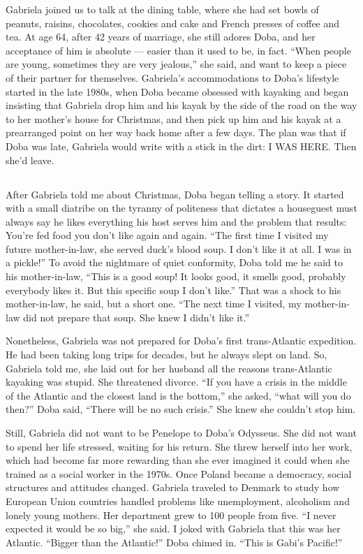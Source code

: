 Gabriela joined us to talk at the dining table, where she had set bowls
of peanuts, raisins, chocolates, cookies and cake and French presses of
coffee and tea. At age 64, after 42 years of marriage, she still adores
Doba, and her acceptance of him is absolute --- easier than it used to
be, in fact. ``When people are young, sometimes they are very jealous,''
she said, and want to keep a piece of their partner for themselves.
Gabriela's accommodations to Doba's lifestyle started in the late 1980s,
when Doba became obsessed with kayaking and began insisting that
Gabriela drop him and his kayak by the side of the road on the way to
her mother's house for Christmas, and then pick up him and his kayak at
a prearranged point on her way back home after a few days. The plan was
that if Doba was late, Gabriela would write with a stick in the dirt: I
WAS HERE. Then she'd leave.

\hypertarget{-2}{%
\subsection{}\label{-2}}

After Gabriela told me about Christmas, Doba began telling a story. It
started with a small diatribe on the tyranny of politeness that dictates
a houseguest must always say he likes everything his host serves him and
the problem that results: You're fed food you don't like again and
again. ``The first time I visited my future mother-in-law, she served
duck's blood soup. I don't like it at all. I was in a pickle!'' To avoid
the nightmare of quiet conformity, Doba told me he said to his
mother-in-law, ``This is a good soup! It looks good, it smells good,
probably everybody likes it. But this specific soup I don't like.'' That
was a shock to his mother-in-law, he said, but a short one. ``The next
time I visited, my mother-in-law did not prepare that soup. She knew I
didn't like it.''

Nonetheless, Gabriela was not prepared for Doba's first trans-Atlantic
expedition. He had been taking long trips for decades, but he always
slept on land. So, Gabriela told me, she laid out for her husband all
the reasons trans-Atlantic kayaking was stupid. She threatened divorce.
``If you have a crisis in the middle of the Atlantic and the closest
land is the bottom,'' she asked, ``what will you do then?'' Doba said,
``There will be no such crisis.'' She knew she couldn't stop him.

Still, Gabriela did not want to be Penelope to Doba's Odysseus. She did
not want to spend her life stressed, waiting for his return. She threw
herself into her work, which had become far more rewarding than she ever
imagined it could when she trained as a social worker in the 1970s. Once
Poland became a democracy, social structures and attitudes changed.
Gabriela traveled to Denmark to study how European Union countries
handled problems like unemployment, alcoholism and lonely young mothers.
Her department grew to 100 people from five. ``I never expected it would
be so big,'' she said. I joked with Gabriela that this was her Atlantic.
``Bigger than the Atlantic!'' Doba chimed in. ``This is Gabi's
Pacific!''

